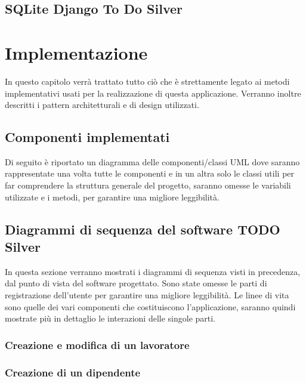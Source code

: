\documentclass[ 4paper,11pt,openany]{book}
\begin{document}
\section{SQLite Django To Do Silver}








\chapter{Implementazione}
In questo capitolo verrà trattato tutto ciò che è strettamente legato ai metodi implementativi usati per la realizzazione di questa applicazione. Verranno inoltre descritti i pattern architetturali e di design utilizzati.

\section{Componenti implementati}
Di seguito è riportato un diagramma delle componenti/classi UML dove saranno rappresentate una volta tutte le componenti e in un altra solo le classi utili per far comprendere la struttura generale del progetto, saranno omesse le variabili utilizzate e i metodi, per garantire una migliore leggibilità.

\section{Diagrammi di sequenza del software TODO Silver}
In questa sezione verranno mostrati i diagrammi di sequenza visti in precedenza, dal punto di vista del software progettato. Sono state omesse le parti di registrazione dell'utente per garantire una migliore leggibilità. Le linee di vita sono quelle dei vari componenti che costituiscono l'applicazione, saranno quindi mostrate più in dettaglio le interazioni delle singole parti.
\subsection{Creazione e modifica di un lavoratore}
\subsection{Creazione di un dipendente}
\end{document}
